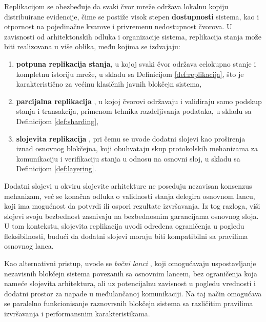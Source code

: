 Replikacijom se obezbeđuje da svaki čvor mreže održava lokalnu kopiju distribuirane evidencije, čime se postiže visok stepen \textbf{dostupnosti} sistema, kao i otpornost na pojedinačne kvarove i privremenu nedostupnost čvorova. U zavisnosti od arhitektonskih odluka i organizacije sistema, replikacija stanja može biti realizovana u više oblika, među kojima se izdvajaju:
\begin{enumerate}
\item \textbf{potpuna replikacija stanja}, u kojoj svaki čvor održava celokupno stanje i kompletnu istoriju mreže, u skladu sa Definicijom \ref{def:replikacija}, što je karakteristično za većinu klasičnih javnih blokčejn sistema,
\item \textbf{parcijalna replikacija} \cite{dang2019towards}, u kojoj čvorovi održavaju i validiraju samo podskup stanja i transakcija, primenom tehnika razdeljivanja podataka, u skladu sa Definicijom \ref{def:sharding},
\item \textbf{slojevita replikacija} \cite{sguanci2021layer}, pri čemu se uvode dodatni slojevi kao proširenja iznad osnovnog blokčejna, koji obuhvataju skup protokolskih mehanizama za komunikaciju i verifikaciju stanja u odnosu na osnovni sloj, u skladu sa Definicijom \ref{def:layering}.
\end{enumerate}

Dodatni slojevi u okviru slojevite arhitekture ne poseduju nezavisan konsenzus mehanizam, već se konačna odluka o validnosti stanja delegira osnovnom lancu, koji ima mogućnost da potvrdi ili ospori rezultate izvršavanja. Iz tog razloga, viši slojevi svoju bezbednost zasnivaju na bezbednosnim garancijama osnovnog sloja. U tom kontekstu, slojevita replikacija uvodi određena ograničenja u pogledu fleksibilnosti, budući da dodatni slojevi moraju biti kompatibilni sa pravilima osnovnog lanca.

Kao alternativni pristup, uvode se \textit{bočni lanci}  \cite{back2014enabling}, koji omogućavaju uspostavljanje nezavisnih blokčejn sistema povezanih sa osnovnim lancem, bez ograničenja koja nameće slojevita arhitektura, ali uz potencijalnu zavisnost u pogledu vrednosti i dodatni prostor za napade u međulančanoj komunikaciji. Na taj način omogućava se paralelno funkcionisanje raznovrsnih blokčejn sistema sa različitim pravilima izvršavanja i performansnim karakteristikama.

